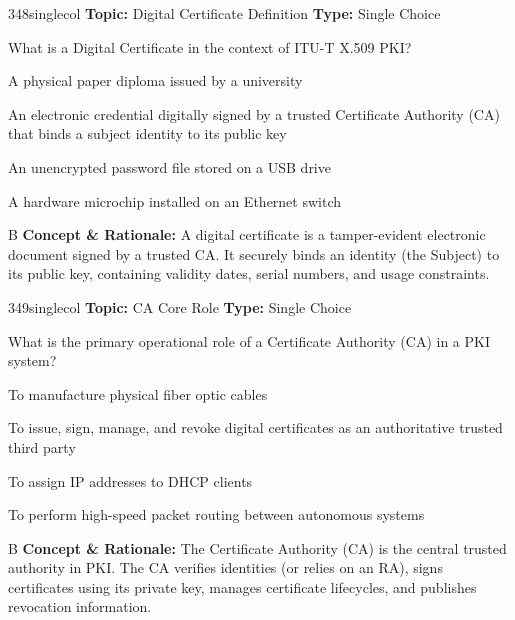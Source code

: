 \begin{qcard}{348}{singlecol}
\textcolor{darkslate!75}{\small\textbf{Topic:} Digital Certificate Definition \hfill \textbf{Type:} Single Choice}\vspace{0.4em}\par
What is a Digital Certificate in the context of ITU-T X.509 PKI?
\begin{qoptions}
\item A physical paper diploma issued by a university
\item An electronic credential digitally signed by a trusted Certificate Authority (CA) that binds a subject identity to its public key
\item An unencrypted password file stored on a USB drive
\item A hardware microchip installed on an Ethernet switch
\end{qoptions}
\end{qcard}
\nopagebreak
\begin{explainbox}{B}
\textbf{Concept \& Rationale:} A digital certificate is a tamper-evident electronic document signed by a trusted CA. It securely binds an identity (the Subject) to its public key, containing validity dates, serial numbers, and usage constraints.
\end{explainbox}

\begin{qcard}{349}{singlecol}
\textcolor{darkslate!75}{\small\textbf{Topic:} CA Core Role \hfill \textbf{Type:} Single Choice}\vspace{0.4em}\par
What is the primary operational role of a Certificate Authority (CA) in a PKI system?
\begin{qoptions}
\item To manufacture physical fiber optic cables
\item To issue, sign, manage, and revoke digital certificates as an authoritative trusted third party
\item To assign IP addresses to DHCP clients
\item To perform high-speed packet routing between autonomous systems
\end{qoptions}
\end{qcard}
\nopagebreak
\begin{explainbox}{B}
\textbf{Concept \& Rationale:} The Certificate Authority (CA) is the central trusted authority in PKI. The CA verifies identities (or relies on an RA), signs certificates using its private key, manages certificate lifecycles, and publishes revocation information.
\end{explainbox}

